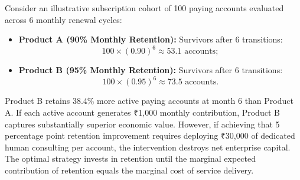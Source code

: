 Consider an illustrative subscription cohort of 100 paying accounts evaluated across 6 monthly renewal cycles:
\begin{itemize}
\item \textbf{Product A (90\% Monthly Retention):} Survivors after 6 transitions:
\begin{equation}
100 \times (0.90)^6 \approx 53.1 \text{ accounts};
\end{equation}
\item \textbf{Product B (95\% Monthly Retention):} Survivors after 6 transitions:
\begin{equation}
100 \times (0.95)^6 \approx 73.5 \text{ accounts}.
\end{equation}
\end{itemize}
Product B retains 38.4\% more active paying accounts at month 6 than Product A. If each active account generates ₹1,000 monthly contribution, Product B captures substantially superior economic value. However, if achieving that 5 percentage point retention improvement requires deploying ₹30,000 of dedicated human consulting per account, the intervention destroys net enterprise capital. The optimal strategy invests in retention until the marginal expected contribution of retention equals the marginal cost of service delivery.
